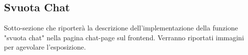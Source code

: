 \subsection{Svuota Chat}

Sotto-sezione che riporterà la descrizione dell'implementazione della funzione "svuota chat" nella pagina chat-page sul frontend.
Verranno riportati immagini per agevolare l'esposizione.
